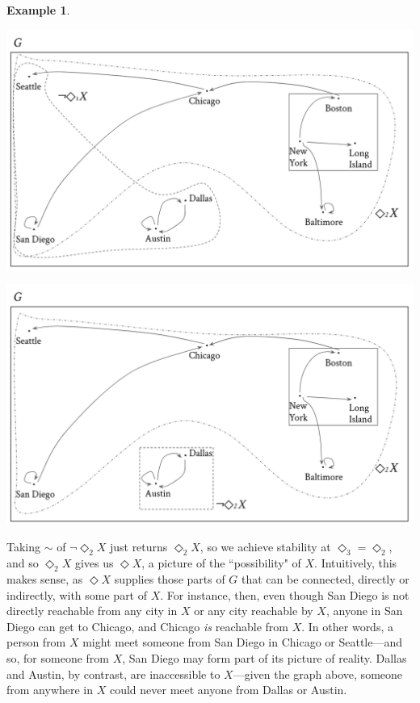\documentclass[a4paper]{book}
\theoremstyle{definition}
\newtheorem{example}{Example}[section]
\theoremstyle{definition}
\theoremstyle{definition}
\theoremstyle{theorem}
\theoremstyle{definition}
\begin{document}
\begin{example}
\begin{center}
	\end{center}
	\begin{center}
		\includegraphics*[scale=0.2]{RoutesGraph7.png}
	\end{center}
	\begin{center}
		\includegraphics*[scale=0.2]{RoutesGraph8.png}
	\end{center}
	Taking $\sim$ of $\neg \Diamond_2 X$ just returns $\Diamond_2 X$, so we achieve stability at $\Diamond_3 = \Diamond_2$, and so $\Diamond_2 X$ gives us $\Diamond X$, a picture of the ``possibility" of $X$. Intuitively, this makes sense, as $\Diamond X$ supplies those parts of $G$ that can be connected, directly or indirectly, with some part of $X$. For instance, then, even though San Diego is not directly reachable from any city in $X$ or any city reachable by $X$, anyone in San Diego can get to Chicago, and Chicago \textit{is} reachable from $X$. In other words, a person from $X$ might meet someone from San Diego in Chicago or Seattle---and so, for someone from $X$, San Diego may form part of its picture of reality. Dallas and Austin, by contrast, are inaccessible to $X$---given the graph above, someone from anywhere in $X$ could never meet anyone from Dallas or Austin. \par    

\end{example}
\end{document}
